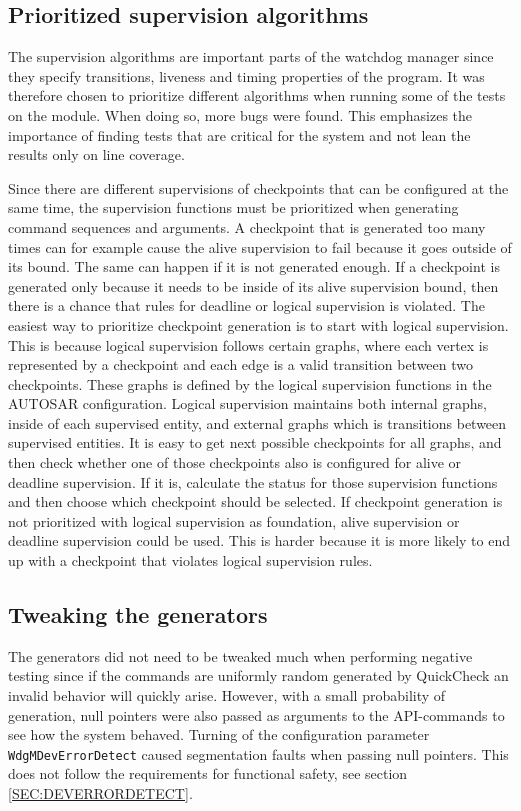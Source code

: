 \subsection{Prioritized supervision algorithms}
The supervision algorithms are important parts of the watchdog manager
since they specify transitions, liveness and timing properties of the
program. It was therefore chosen to prioritize different algorithms
when running some of the tests on the module. When doing so, more bugs
were found. This emphasizes the importance of finding tests that are
critical for the system and not lean the results only on line
coverage.

Since there are different supervisions of checkpoints that can be
configured at the same time, the supervision functions must be
prioritized when generating command sequences and arguments. A
checkpoint that is generated too many times can for example cause the
alive supervision to fail because it goes outside of its bound. The
same can happen if it is not generated enough. If a checkpoint is
generated only because it needs to be inside of its alive supervision
bound, then there is a chance that rules for deadline or logical
supervision is violated. The easiest way to prioritize checkpoint
generation is to start with logical supervision. This is because
logical supervision follows certain graphs, where each vertex is
represented by a checkpoint and each edge is a valid transition
between two checkpoints. These graphs is defined by the logical
supervision functions in the AUTOSAR configuration.  Logical
supervision maintains both internal graphs, inside of each supervised
entity, and external graphs which is transitions between supervised
entities. It is easy to get next possible checkpoints for all graphs,
and then check whether one of those checkpoints also is configured for
alive or deadline supervision. If it is, calculate the status for
those supervision functions and then choose which checkpoint should be
selected.  If checkpoint generation is not prioritized with logical
supervision as foundation, alive supervision or deadline supervision
could be used. This is harder because it is more likely to end up with
a checkpoint that violates logical supervision rules.

\subsection{Tweaking the generators}
The generators did not need to be tweaked much when performing
negative testing since if the commands are uniformly random generated
by QuickCheck an invalid behavior will quickly arise. However, with a
small probability of generation, null pointers were also passed as
arguments to the API-commands to see how the system behaved. Turning
of the configuration parameter \lstinline!WdgMDevErrorDetect! caused
segmentation faults when passing null pointers. This does not follow
the requirements for functional safety, see section
\ref{SEC:DEVERRORDETECT}.

